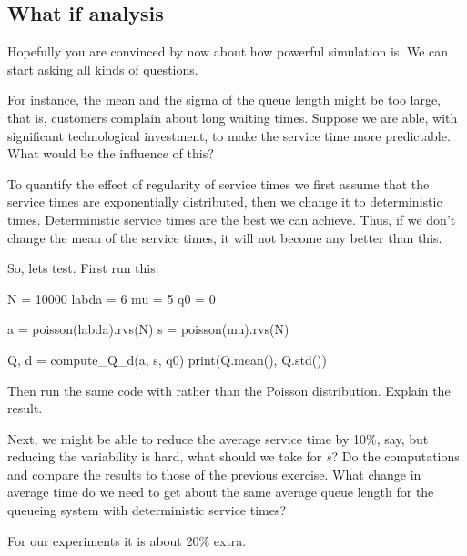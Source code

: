 \documentclass{scrartcl}
\begin{document}
\subsection{What if analysis}
\label{sec:what-if-analysis}

Hopefully you  are  convinced by now about how powerful simulation is.  We can start asking all kinds of questions.

\begin{exercise}
  For instance,  the mean and the sigma of the queue length might be too large, that is, customers complain about long waiting times.  Suppose we are able, with significant technological investment, to make the service time more predictable. What would be the influence of this?

To quantify the effect of regularity of service times we first assume that the service times are exponentially distributed, then we change it to deterministic times.
 Deterministic service times are the best we can achieve. Thus, if we don't change the mean of the service times, it will not become any better than this.


So, lets test. First run this:
\begin{pyblock}
N = 10000
labda = 6
mu = 5
q0 = 0

a = poisson(labda).rvs(N)
s = poisson(mu).rvs(N)

Q, d = compute_Q_d(a, s, q0)
print(Q.mean(), Q.std())
  \end{pyblock}
  Then run the same code with  rather than the Poisson distribution. Explain the result.
\end{exercise}



\begin{exercise}
  Next, we might be able to reduce the average service time by 10\%, say, but reducing the variability is hard, what should we take for $s$? Do the computations and compare the results to those of the previous exercise. What change in average time do we need to get about the same average queue length for the queueing system with deterministic service times?
  \begin{solution}
For our experiments it is about 20\% extra.
  \end{solution}
\end{exercise}
\end{document}
